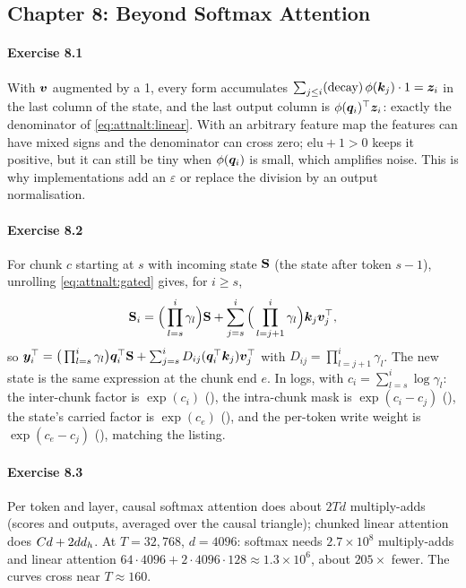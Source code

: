 \subsection*{Chapter 8: Beyond Softmax Attention}

\paragraph{Exercise 8.1} With $\bm{v}$ augmented by a 1, every form accumulates
$\sum_{j\le i}(\text{decay})\,\phi(\bm{k}_j)\cdot1=\bm{z}_i$ in the last column of the state, and the last
output column is $\phi(\bm{q}_i)^\top\bm{z}_i$: exactly the denominator of \cref{eq:attnalt:linear}. With an
arbitrary feature map the features can have mixed signs and the denominator can cross zero; $\mathrm{elu}+1>0$
keeps it positive, but it can still be tiny when $\phi(\bm{q}_i)$ is small, which amplifies noise. This is why
implementations add an $\varepsilon$ or replace the division by an output normalisation.

\paragraph{Exercise 8.2} For chunk $c$ starting at $s$ with incoming state $\mathbf{S}$ (the state after token
$s-1$), unrolling \cref{eq:attnalt:gated} gives, for $i\ge s$,
\[
\mathbf{S}_i=\Big(\prod_{l=s}^{i}\gamma_l\Big)\mathbf{S}+\sum_{j=s}^{i}\Big(\prod_{l=j+1}^{i}\gamma_l\Big)\bm{k}_j\bm{v}_j^\top ,
\]
so $\bm{y}_i^\top=\big(\prod_{l=s}^{i}\gamma_l\big)\bm{q}_i^\top\mathbf{S}+\sum_{j=s}^{i}D_{ij}(\bm{q}_i^\top\bm{k}_j)\bm{v}_j^\top$
with $D_{ij}=\prod_{l=j+1}^i\gamma_l$. The new state is the same expression at the chunk end $e$. In logs,
with $c_i=\sum_{l=s}^{i}\log\gamma_l$: the inter-chunk factor is $\exp(c_i)$ (), the
intra-chunk mask is $\exp(c_i-c_j)$ (), the state's carried factor is $\exp(c_e)$
(), and the per-token write weight is $\exp(c_e-c_j)$ (), matching the listing.

\paragraph{Exercise 8.3} Per token and layer, causal softmax attention does about $2Td$ multiply-adds (scores and
outputs, averaged over the causal triangle); chunked linear attention does $Cd+2dd_{h}$. At $T=32{,}768$,
$d=4096$: softmax needs $2.7\times10^8$ multiply-adds and linear attention
$64\cdot4096+2\cdot4096\cdot128\approx1.3\times10^6$, about $205\times$ fewer. The curves cross near $T\approx160$.

